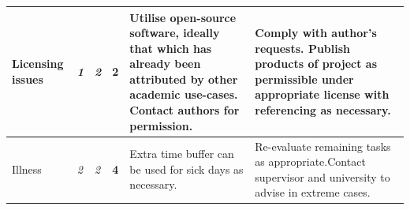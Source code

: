 \documentclass[12pt,a4,xcolor=table]{article}
\begin{document}
\begin{table}[h!]
\begin{tabular}{|>{\centering}m{1.5in} |>{\centering}m{0.1in} |>{\centering}m{0.1in} |>{\centering}m{0.3in} |>{\centering}m{1.8in} |>{\centering\arraybackslash}m{1.8in}|}
			Licensing issues                                                 & \cellcolor[HTML]{ABCB00}\textit{1} & \cellcolor[HTML]{F8FF00}\textit{2} & \cellcolor[HTML]{F8FF00}\textbf{2} & Utilise open-source software, ideally that which has already been attributed by other academic use-cases. Contact authors for permission.                         & Comply with author's requests. Publish products of project as permissible under appropriate license with referencing as necessary.                                                   \\ \hline
			Illness                                                          & \cellcolor[HTML]{F8FF00}\textit{2} & \cellcolor[HTML]{F8FF00}\textit{2} & \cellcolor[HTML]{F8FF00}\textbf{4} & Extra time buffer can be used for sick days as necessary.                                                                                                         & Re-evaluate remaining tasks as appropriate.Contact supervisor and university to advise in extreme cases.                                                                             \\ \hline
		\end{tabular}
	\end{table}
	
\end{document}
